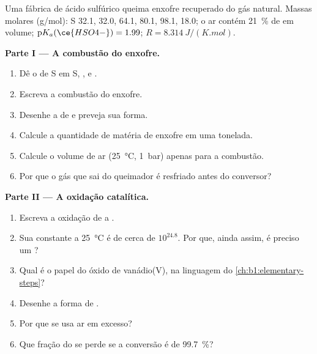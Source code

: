 \begin{problem}
\label{pb:b1:p-block-16-18:1}
Uma fábrica de ácido sulfúrico queima enxofre recuperado do gás natural.
Massas molares (\unit{g/mol}): S 32.1,  32.0,  64.1,  80.1,
 98.1,  18.0; o ar contém \qty{21}{\percent} de
 em volume; $\mathrm{p}K_a(\ce{HSO4-}) = 1.99$; $R =
\qty{8.314}{J/(K.mol)}$.

\medskip
\noindent\textbf{Parte I --- A combustão do enxofre.}
\begin{enumerate}
  \item Dê o  de S em S, ,  e
        .
  \item Escreva a combustão do enxofre.
  \item Desenhe a  de  e preveja sua forma.
  \item Calcule a quantidade de matéria de enxofre em uma tonelada.
  \item Calcule o volume de ar (\qty{25}{\celsius}, \qty{1}{bar}) apenas
        para a combustão.
  \item Por que o gás que sai do queimador é resfriado antes do conversor?
\end{enumerate}

\medskip
\noindent\textbf{Parte II --- A oxidação catalítica.}
\begin{enumerate}[resume]
  \item Escreva a oxidação de  a .
  \item Sua constante a \qty{25}{\celsius} é de cerca de $10^{24.8}$. Por
        que, ainda assim, é preciso um ?
  \item Qual é o papel do óxido de vanádio(V), na linguagem do
        \cref{ch:b1:elementary-steps}?
  \item Desenhe a forma de .
  \item Por que se usa ar em excesso?
  \item Que fração do  se perde se a conversão é de
        \qty{99.7}{\percent}?
\end{enumerate}


\end{problem}
